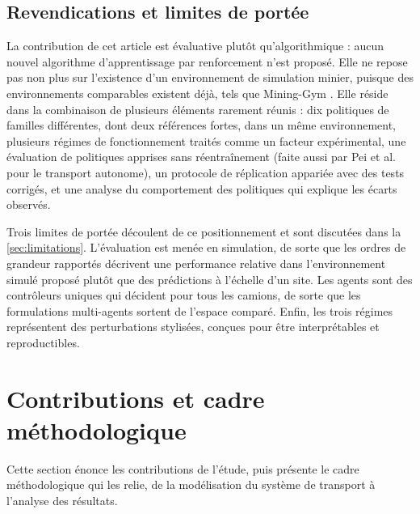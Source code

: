 \documentclass[11pt,a4paper]{article}
\newif\ifrevmarks
\newcommand{\revtag}[1]{\ifrevmarks\textsuperscript{\textcolor{red!70!black}{\scriptsize[#1]}}\fi}
\newcommand{\rev}[2]{\ifrevmarks{\color{revcolor}#2}\revtag{#1}\else#2\fi}
\newenvironment{revbloc}[1]{\par\ifrevmarks\color{revcolor}\noindent\revtag{#1}\ \fi}{\par}
\begin{document}
\subsection{Revendications et limites de portée}

\begin{revbloc}{M26, M27}
La contribution de cet article est évaluative plutôt qu'algorithmique : aucun nouvel algorithme d'apprentissage par renforcement n'est proposé. Elle ne repose pas non plus sur l'existence d'un environnement de simulation minier, puisque des environnements comparables existent déjà, tels que Mining-Gym \cite{Banerjee2025}. Elle réside dans la combinaison de plusieurs éléments rarement réunis : \rev{T31}{dix politiques de familles différentes, dont deux références fortes,} dans un même environnement, plusieurs régimes de fonctionnement traités comme un facteur expérimental, une évaluation de politiques apprises sans réentraînement \rev{v3}{(faite aussi par Pei et al.~\cite{Pei2025} pour le transport autonome)}, un protocole de réplication appariée avec des tests corrigés, et une analyse du comportement des politiques qui explique les écarts observés.

Trois limites de portée découlent de ce positionnement et sont discutées dans la \cref{sec:limitations}. L'évaluation est menée en simulation, de sorte que les ordres de grandeur rapportés décrivent une performance relative dans l'environnement simulé proposé plutôt que des prédictions à l'échelle d'un site. Les agents sont des contrôleurs uniques qui décident pour tous les camions, de sorte que les formulations multi-agents \cite{Zhao2025} sortent de l'espace comparé. Enfin, les trois régimes représentent des perturbations stylisées, conçues pour être interprétables et reproductibles.
\end{revbloc}



\section{Contributions et cadre méthodologique}
\label{sec:contributions}

Cette section énonce les contributions de l'étude, puis présente le cadre méthodologique qui les relie, de la modélisation du système de transport à l'analyse des résultats.
\end{document}
